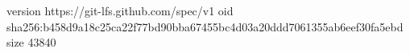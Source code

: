 version https://git-lfs.github.com/spec/v1
oid sha256:b458d9a18c25ca22f77bd90bba67455bc4d03a20ddd7061355ab6eef30fa5ebd
size 43840
